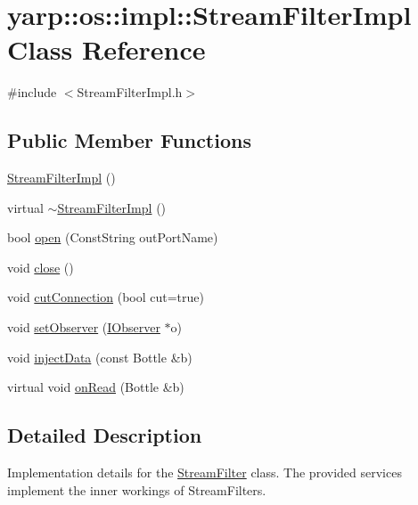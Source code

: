 \hypertarget{classyarp_1_1os_1_1impl_1_1_stream_filter_impl}{
\section{yarp::os::impl::StreamFilterImpl Class Reference}
\label{classyarp_1_1os_1_1impl_1_1_stream_filter_impl}
}


{\ttfamily \#include $<$StreamFilterImpl.h$>$}\subsection*{Public Member Functions}
\begin{DoxyCompactItemize}
\item 
\hyperlink{classyarp_1_1os_1_1impl_1_1_stream_filter_impl_a34b63ca7d32244a7c0ec974ce7d3c2f2}{StreamFilterImpl} ()
\item 
virtual \hyperlink{classyarp_1_1os_1_1impl_1_1_stream_filter_impl_a57728d60fe69bb2946135cbc817e6400}{$\sim$StreamFilterImpl} ()
\item 
bool \hyperlink{classyarp_1_1os_1_1impl_1_1_stream_filter_impl_a89e921dc1fa47bc6136bc3135e89ae03}{open} (ConstString outPortName)
\item 
void \hyperlink{classyarp_1_1os_1_1impl_1_1_stream_filter_impl_afe2c98307b0051805788c690b160b977}{close} ()
\item 
void \hyperlink{classyarp_1_1os_1_1impl_1_1_stream_filter_impl_a9a7a37fe9ac8b71cc7a6a54a118617fc}{cutConnection} (bool cut=true)
\item 
void \hyperlink{classyarp_1_1os_1_1impl_1_1_stream_filter_impl_a269889b1cdc1992968861e49d7542e5d}{setObserver} (\hyperlink{classyarp_1_1os_1_1_i_observer}{IObserver} $\ast$o)
\item 
void \hyperlink{classyarp_1_1os_1_1impl_1_1_stream_filter_impl_a114406a0f5eb4ae4c002a76f998e89b2}{injectData} (const Bottle \&b)
\item 
virtual void \hyperlink{classyarp_1_1os_1_1impl_1_1_stream_filter_impl_a9ffe25ea43e69bcc50d3334fea26fff5}{onRead} (Bottle \&b)
\end{DoxyCompactItemize}


\subsection{Detailed Description}
Implementation details for the {\ttfamily \hyperlink{classyarp_1_1os_1_1_stream_filter}{StreamFilter}} class. The provided services implement the inner workings of StreamFilters.

